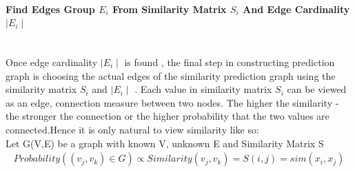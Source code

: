 \documentclass[a4paper]{article}
\begin{document}
\paragraph{Find Edges Group $E_i$ From Similarity Matrix $S_i$ And Edge Cardinality $\mid E_i \mid$}\hspace{0pt}\\
Once edge cardinality $\mid E_i \mid$ is found , the final step in constructing prediction graph is choosing the actual edges of the similarity prediction graph using the similarity matrix $S_i$ and $\mid E_i \mid$ .
Each value in similarity matrix $S_i$ can be viewed as an edge, connection measure between two nodes.
The higher the similarity - the stronger the connection or the higher probability that the two values are connected.Hence it is only natural to view similarity like so:\\
Let G(V,E) be a graph with known V, unknown E and Similarity Matrix S\\
\begin{align*} 
Probability( (v_j,v_k)\in G) \propto  Similarity(v_j,v_k) = S(i,j)=sim(x_i,x_j)
\end{align*}
\end{document}
